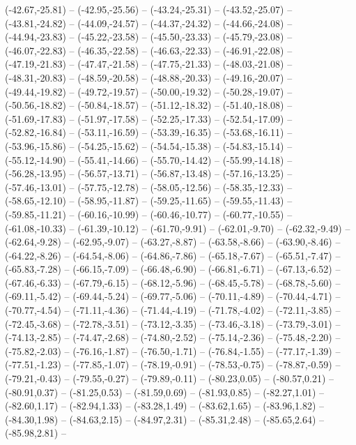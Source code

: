 {  (-42.67,-25.81) -- (-42.95,-25.56) -- (-43.24,-25.31) -- (-43.52,-25.07) -- (-43.81,-24.82) -- (-44.09,-24.57) -- (-44.37,-24.32) --
  (-44.66,-24.08) -- (-44.94,-23.83) -- (-45.22,-23.58) -- (-45.50,-23.33) -- (-45.79,-23.08) -- (-46.07,-22.83) -- (-46.35,-22.58) --
  (-46.63,-22.33) -- (-46.91,-22.08) -- (-47.19,-21.83) -- (-47.47,-21.58) -- (-47.75,-21.33) -- (-48.03,-21.08) -- (-48.31,-20.83) --
  (-48.59,-20.58) -- (-48.88,-20.33) -- (-49.16,-20.07) -- (-49.44,-19.82) -- (-49.72,-19.57) -- (-50.00,-19.32) -- (-50.28,-19.07) --
  (-50.56,-18.82) -- (-50.84,-18.57) -- (-51.12,-18.32) -- (-51.40,-18.08) -- (-51.69,-17.83) -- (-51.97,-17.58) -- (-52.25,-17.33) --
  (-52.54,-17.09) -- (-52.82,-16.84) -- (-53.11,-16.59) -- (-53.39,-16.35) -- (-53.68,-16.11) -- (-53.96,-15.86) -- (-54.25,-15.62) --
  (-54.54,-15.38) -- (-54.83,-15.14) -- (-55.12,-14.90) -- (-55.41,-14.66) -- (-55.70,-14.42) -- (-55.99,-14.18) -- (-56.28,-13.95) --
  (-56.57,-13.71) -- (-56.87,-13.48) -- (-57.16,-13.25) -- (-57.46,-13.01) -- (-57.75,-12.78) -- (-58.05,-12.56) -- (-58.35,-12.33) --
  (-58.65,-12.10) -- (-58.95,-11.87) -- (-59.25,-11.65) -- (-59.55,-11.43) -- (-59.85,-11.21) -- (-60.16,-10.99) -- (-60.46,-10.77) --
  (-60.77,-10.55) -- (-61.08,-10.33) -- (-61.39,-10.12) -- (-61.70,-9.91) -- (-62.01,-9.70) -- (-62.32,-9.49) -- (-62.64,-9.28) --
  (-62.95,-9.07) -- (-63.27,-8.87) -- (-63.58,-8.66) -- (-63.90,-8.46) -- (-64.22,-8.26) -- (-64.54,-8.06) -- (-64.86,-7.86) --
  (-65.18,-7.67) -- (-65.51,-7.47) -- (-65.83,-7.28) -- (-66.15,-7.09) -- (-66.48,-6.90) -- (-66.81,-6.71) -- (-67.13,-6.52) --
  (-67.46,-6.33) -- (-67.79,-6.15) -- (-68.12,-5.96) -- (-68.45,-5.78) -- (-68.78,-5.60) -- (-69.11,-5.42) -- (-69.44,-5.24) --
  (-69.77,-5.06) -- (-70.11,-4.89) -- (-70.44,-4.71) -- (-70.77,-4.54) -- (-71.11,-4.36) -- (-71.44,-4.19) -- (-71.78,-4.02) --
  (-72.11,-3.85) -- (-72.45,-3.68) -- (-72.78,-3.51) -- (-73.12,-3.35) -- (-73.46,-3.18) -- (-73.79,-3.01) -- (-74.13,-2.85) --
  (-74.47,-2.68) -- (-74.80,-2.52) -- (-75.14,-2.36) -- (-75.48,-2.20) -- (-75.82,-2.03) -- (-76.16,-1.87) -- (-76.50,-1.71) --
  (-76.84,-1.55) -- (-77.17,-1.39) -- (-77.51,-1.23) -- (-77.85,-1.07) -- (-78.19,-0.91) -- (-78.53,-0.75) -- (-78.87,-0.59) --
  (-79.21,-0.43) -- (-79.55,-0.27) -- (-79.89,-0.11) -- (-80.23,0.05) -- (-80.57,0.21) -- (-80.91,0.37) -- (-81.25,0.53) --
  (-81.59,0.69) -- (-81.93,0.85) -- (-82.27,1.01) -- (-82.60,1.17) -- (-82.94,1.33) -- (-83.28,1.49) -- (-83.62,1.65) --
  (-83.96,1.82) -- (-84.30,1.98) -- (-84.63,2.15) -- (-84.97,2.31) -- (-85.31,2.48) -- (-85.65,2.64) -- (-85.98,2.81) --
}
